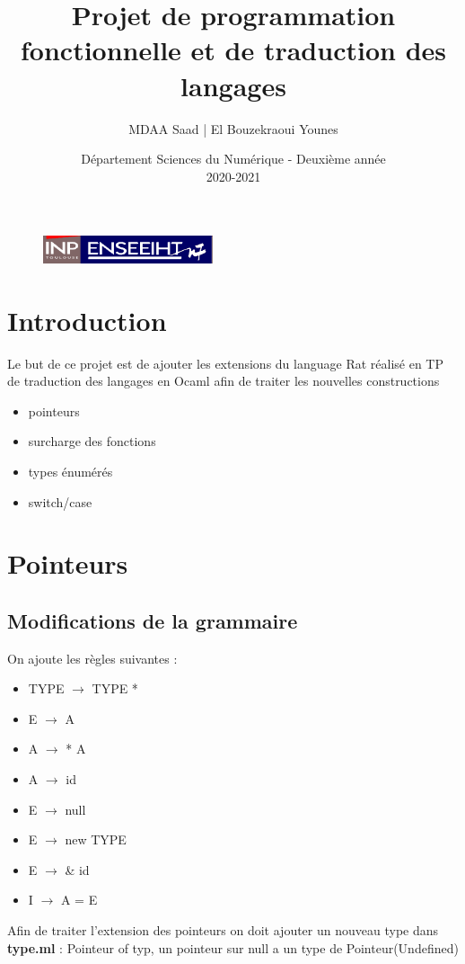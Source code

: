 \documentclass{article}
\begin{document}
\begin{figure}[t]
\centering
\includegraphics[width=5cm]{inp_n7.png}
\end{figure}

\title{\vspace{4cm} \textbf{Projet de programmation fonctionnelle et de traduction des langages}}
\author{MDAA Saad | El Bouzekraoui Younes}
\date{\vspace{7cm} Département Sciences du Numérique - Deuxième année \\
2020-2021 }

\maketitle

\newpage
\tableofcontents

\newpage
\section{Introduction}
Le but de ce projet est de ajouter les extensions du language Rat  réalisé en TP de traduction des langages en Ocaml afin de traiter les nouvelles 
constructions 
\begin{itemize}
    \item pointeurs
    \item surcharge des fonctions
    \item types énumérés
    \item switch/case
\end{itemize}
\section{Pointeurs}
\subsection{Modifications de la grammaire}
On ajoute les règles suivantes :
\begin{itemize}
    \item TYPE $\rightarrow$ TYPE *
    \item E $\rightarrow$ A
    \item A $\rightarrow$ * A
    \item A $\rightarrow$ id
    \item E $\rightarrow$ null
    \item E $\rightarrow$ new TYPE
    \item E $\rightarrow$ \& id
    \item I $\rightarrow$ A = E
\end{itemize}
Afin de traiter l'extension des pointeurs on doit ajouter un nouveau type dans \textbf{type.ml} : Pointeur of typ,
un pointeur sur null a un type de Pointeur(Undefined)
\end{document}

